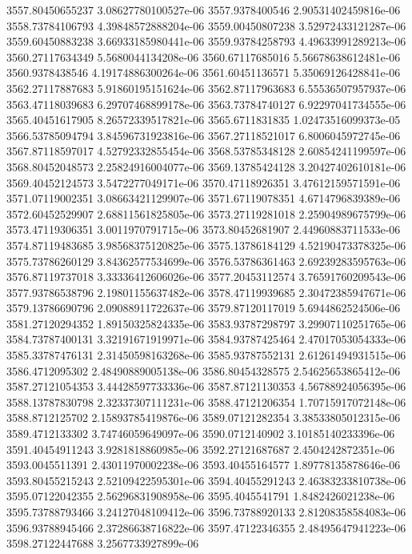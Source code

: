 {3557.80450655237 3.08627780100527e-06
3557.9378400546 2.90531402459816e-06
3558.73784106793 4.39848572888204e-06
3559.00450807238 3.52972433121287e-06
3559.60450883238 3.66933185980441e-06
3559.93784258793 4.49633991289213e-06
3560.27117634349 5.5680044134208e-06
3560.67117685016 5.56678638612481e-06
3560.9378438546 4.19174886300264e-06
3561.60451136571 5.35069126428841e-06
3562.27117887683 5.91860195151624e-06
3562.87117963683 6.55536507957937e-06
3563.47118039683 6.29707468899178e-06
3563.73784740127 6.92297041734555e-06
3565.40451617905 8.26572339517821e-06
3565.6711831835 1.02473516099373e-05
3566.53785094794 3.84596731923816e-06
3567.27118521017 6.8006045972745e-06
3567.87118597017 4.52792332855454e-06
3568.53785348128 2.60854241199597e-06
3568.80452048573 2.25824916004077e-06
3569.13785424128 3.20427402610181e-06
3569.40452124573 3.5472277049171e-06
3570.47118926351 3.47612159571591e-06
3571.07119002351 3.08663421129907e-06
3571.67119078351 4.6714796839389e-06
3572.60452529907 2.68811561825805e-06
3573.27119281018 2.25904989675799e-06
3573.47119306351 3.0011970791715e-06
3573.80452681907 2.44960883711533e-06
3574.87119483685 3.98568375120825e-06
3575.13786184129 4.52190473378325e-06
3575.73786260129 3.84362577534699e-06
3576.53786361463 2.69239283595763e-06
3576.87119737018 3.33336412606026e-06
3577.20453112574 3.76591760209543e-06
3577.93786538796 2.19801155637482e-06
3578.47119939685 2.30472385947671e-06
3579.13786690796 2.09088911722637e-06
3579.87120117019 5.6944862524506e-06
3581.27120294352 1.89150325824335e-06
3583.93787298797 3.29907110251765e-06
3584.73787400131 3.32191671919971e-06
3584.93787425464 2.47017053054333e-06
3585.33787476131 2.31450598163268e-06
3585.93787552131 2.61261494931515e-06
3586.4712095302 2.48490889005138e-06
3586.80454328575 2.54625653865412e-06
3587.27121054353 3.44428597733336e-06
3587.87121130353 4.56788924056395e-06
3588.13787830798 2.32337307111231e-06
3588.47121206354 1.70715917072148e-06
3588.8712125702 2.15893785419876e-06
3589.07121282354 3.38533805012315e-06
3589.4712133302 3.74746059649097e-06
3590.0712140902 3.10185140233396e-06
3591.40454911243 3.9281818860985e-06
3592.27121687687 2.4504242872351e-06
3593.0045511391 2.43011970002238e-06
3593.40455164577 1.89778135878646e-06
3593.80455215243 2.52109422595301e-06
3594.40455291243 2.46383233810738e-06
3595.07122042355 2.56296831908958e-06
3595.4045541791 1.8482426021238e-06
3595.73788793466 3.24127048109412e-06
3596.73788920133 2.81208358584083e-06
3596.93788945466 2.37286638716822e-06
3597.47122346355 2.48495647941223e-06
3598.27122447688 3.2567733927899e-06
}
